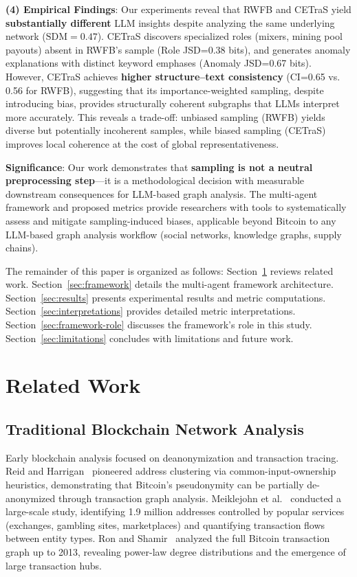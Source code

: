 \textbf{(4) Empirical Findings}: Our experiments reveal that RWFB and CETraS yield \textbf{substantially different} LLM insights despite analyzing the same underlying network ($\text{SDM}{=}0.47$). CETraS discovers specialized roles (mixers, mining pool payouts) absent in RWFB's sample (Role JSD=0.38 bits), and generates anomaly explanations with distinct keyword emphases (Anomaly JSD=0.67 bits). However, CETraS achieves \textbf{higher structure--text consistency} (CI=0.65 vs. 0.56 for RWFB), suggesting that its importance-weighted sampling, despite introducing bias, provides structurally coherent subgraphs that LLMs interpret more accurately. This reveals a trade-off: unbiased sampling (RWFB) yields diverse but potentially incoherent samples, while biased sampling (CETraS) improves local coherence at the cost of global representativeness.

\textbf{Significance}: Our work demonstrates that \textbf{sampling is not a neutral preprocessing step}---it is a methodological decision with measurable downstream consequences for LLM-based graph analysis. The multi-agent framework and proposed metrics provide researchers with tools to systematically assess and mitigate sampling-induced biases, applicable beyond Bitcoin to any LLM-based graph analysis workflow (social networks, knowledge graphs, supply chains).

The remainder of this paper is organized as follows: Section~\ref{sec:related} reviews related work. Section~\ref{sec:framework} details the multi-agent framework architecture. Section~\ref{sec:results} presents experimental results and metric computations. Section~\ref{sec:interpretations} provides detailed metric interpretations. Section~\ref{sec:framework-role} discusses the framework's role in this study. Section~\ref{sec:limitations} concludes with limitations and future work.

\section{Related Work}\label{sec:related}

\subsection{Traditional Blockchain Network Analysis}

Early blockchain analysis focused on deanonymization and transaction tracing. Reid and Harrigan~\cite{reid2011} pioneered address clustering via common-input-ownership heuristics, demonstrating that Bitcoin's pseudonymity can be partially de-anonymized through transaction graph analysis. Meiklejohn et al.~\cite{meiklejohn2013fistful} conducted a large-scale study, identifying 1.9 million addresses controlled by popular services (exchanges, gambling sites, marketplaces) and quantifying transaction flows between entity types. Ron and Shamir~\cite{ron2013quantitative} analyzed the full Bitcoin transaction graph up to 2013, revealing power-law degree distributions and the emergence of large transaction hubs.

